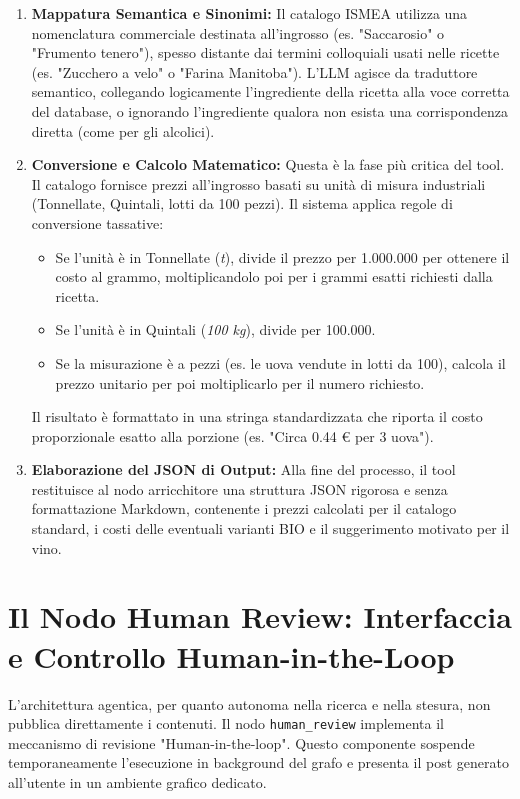 \documentclass[11pt, a4paper]{article}
\begin{document}
\begin{enumerate}
    \item \textbf{Mappatura Semantica e Sinonimi:} Il catalogo ISMEA utilizza una nomenclatura commerciale destinata all'ingrosso (es. "Saccarosio" o "Frumento tenero"), spesso distante dai termini colloquiali usati nelle ricette (es. "Zucchero a velo" o "Farina Manitoba"). L'LLM agisce da traduttore semantico, collegando logicamente l'ingrediente della ricetta alla voce corretta del database, o ignorando l'ingrediente qualora non esista una corrispondenza diretta (come per gli alcolici).
    
    \item \textbf{Conversione e Calcolo Matematico:} Questa è la fase più critica del tool. Il catalogo fornisce prezzi all'ingrosso basati su unità di misura industriali (Tonnellate, Quintali, lotti da 100 pezzi). Il sistema applica regole di conversione tassative:
    \begin{itemize}
        \item Se l'unità è in Tonnellate (\textit{t}), divide il prezzo per 1.000.000 per ottenere il costo al grammo, moltiplicandolo poi per i grammi esatti richiesti dalla ricetta.
        \item Se l'unità è in Quintali (\textit{100 kg}), divide per 100.000.
        \item Se la misurazione è a pezzi (es. le uova vendute in lotti da 100), calcola il prezzo unitario per poi moltiplicarlo per il numero richiesto.
    \end{itemize}
    Il risultato è formattato in una stringa standardizzata che riporta il costo proporzionale esatto alla porzione (es. "Circa 0.44 € per 3 uova").
    
    \item \textbf{Elaborazione del JSON di Output:} Alla fine del processo, il tool restituisce al nodo arricchitore una struttura JSON rigorosa e senza formattazione Markdown, contenente i prezzi calcolati per il catalogo standard, i costi delle eventuali varianti BIO e il suggerimento motivato per il vino.
\end{enumerate}

\section{Il Nodo Human Review: Interfaccia e Controllo Human-in-the-Loop}

L'architettura agentica, per quanto autonoma nella ricerca e nella stesura, non pubblica direttamente i contenuti. Il nodo \texttt{human\_review} implementa il meccanismo di revisione "Human-in-the-loop". Questo componente sospende temporaneamente l'esecuzione in background del grafo e presenta il post generato all'utente in un ambiente grafico dedicato.
\end{document}

